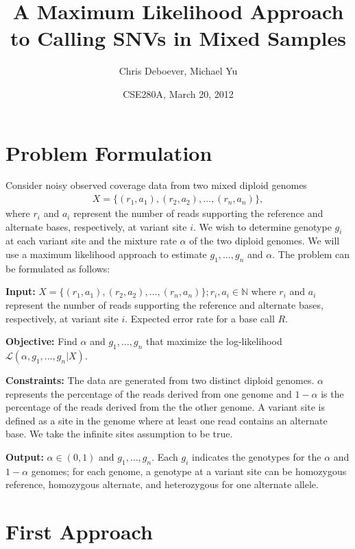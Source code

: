 \documentclass[12pt]{article}
\title{A Maximum Likelihood Approach to Calling SNVs in Mixed Samples}
\author{Chris Deboever, Michael Yu}
\date{CSE280A, March 20, 2012}
\begin{document}

\maketitle

\section{Problem Formulation}

Consider noisy observed coverage data from two mixed diploid genomes 
\begin{align}
X = \{ (r_1,a_1),(r_2,a_2),\dots,(r_n,a_n) \},
\end{align} 
where $r_i$ and $a_i$ represent the number of reads supporting the reference and alternate bases, respectively, at variant site $i$. We wish to determine genotype $g_i$ at each variant site and the mixture rate $\alpha$ of the two diploid genomes. We will use a maximum likelihood approach to estimate $g_1,\dots,g_n$ and $\alpha$. The problem can be formulated as follows:

\textbf{Input:} $X = \{ (r_1,a_1),(r_2,a_2),\dots,(r_n,a_n) \}; r_i,a_i\in \mathbb{N}$ where $r_i$ and $a_i$ represent the number of reads supporting the reference and alternate bases, respectively, at variant site $i$. Expected error rate for a base call $R$.

\textbf{Objective:} Find $\alpha$ and $g_1,\dots,g_n$ that maximize the log-likelihood $\mathcal{L}(\alpha,g_1,\dots,g_n|X)$.

\textbf{Constraints:} The data are generated from two distinct diploid genomes. $\alpha$ represents the percentage of the reads derived from one genome and $1-\alpha$ is the percentage of the reads derived from the the other genome. A variant site is defined as a site in the genome where at least one read contains an alternate base. We take the infinite sites assumption to be true.

\textbf{Output:} $\alpha \in (0,1)$ and $g_1,\dots,g_n$. Each $g_i$ indicates the genotypes for the $\alpha$ and $1-\alpha$ genomes; for each genome, a genotype at a variant site can be homozygous reference, homozygous alternate, and heterozygous for one alternate allele.



\section{ First Approach}
\label{sec:first-approach}
\end{document}
